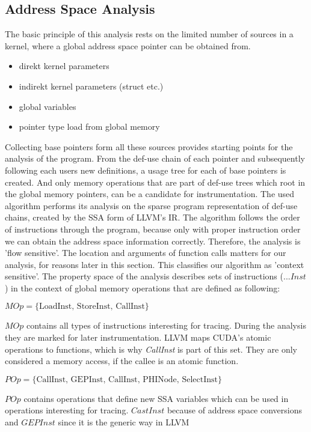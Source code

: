 \subsection{Address Space Analysis}\label{pa}
The basic principle of this analysis rests on the limited number of sources in 
a kernel, where a global address space pointer can be obtained from.
\begin{itemize}
	\item direkt kernel parameters
	\item indirekt kernel parameters (struct etc.)
	\item global variables
	\item pointer type load from global memory
\end{itemize}
Collecting base pointers form all these sources provides starting points for the analysis of the program. From the def-use chain of each pointer and subsequently following each users new definitions, a usage tree for each of base pointers is created. And only memory operations that are part of def-use trees which root in the global memory pointers, can be a candidate for instrumentation.
The used algorithm performs its analysis on the sparse program representation of def-use chains, created by the SSA form of LLVM's IR. The algorithm follows the order of instructions through the program, because only with proper instruction order we can obtain the address space information correctly. Therefore, the analysis is 'flow sensitive'. The location and arguments of function calls matters for our analysis, for reasons later in this section. This classifies our algorithm as 'context sensitive'.
The property space of the analysis describes sets of instructions ($...Inst$) in the context of global memory operations that are defined
as following:
\begin{defi}\label{mop}
	$	MOp = \{\textrm{LoadInst, StoreInst, CallInst}\} $
\end{defi}
$MOp$ contains all types of instructions interesting for tracing. During the analysis they are marked for later instrumentation. LLVM maps CUDA's atomic operations to functions, which is why \textit{CallInst} is part of this set. They are only considered a memory access, if the callee is an atomic function.
\begin{defi}\label{mopp}
	$   POp = \{\textrm{CallInst, GEPInst, CallInst, PHINode, SelectInst}\} $
\end{defi}
$POp$ contains operations that define new SSA variables which can be used in operations interesting for tracing. $CastInst$ because of address space conversions and $GEPInst$ since it is the generic way in LLVM
